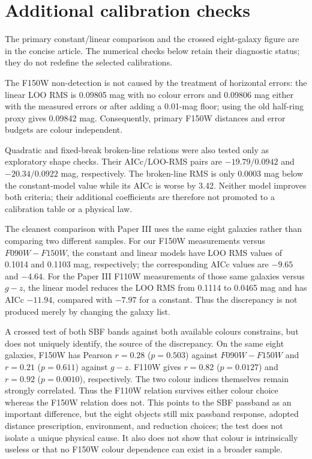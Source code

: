 \documentclass[nodoi,nocopyright]{pas}
\begin{document}
\section{Additional calibration checks}
\label{sec:notes-calibration}
The primary constant/linear comparison and the crossed eight-galaxy figure
are in the concise article. The numerical checks below retain their
diagnostic status; they do not redefine the selected calibrations.

The F150W non-detection is not caused by the treatment of horizontal errors: the linear LOO RMS is 0.09805
mag with no colour errors and 0.09806 mag either with the measured errors or
after adding a 0.01-mag floor; using the old half-ring proxy gives 0.09842
mag. Consequently, primary F150W distances and error budgets are colour independent.

Quadratic and fixed-break broken-line relations were also tested only as
exploratory shape checks. Their AICc/LOO-RMS pairs are $-19.79/0.0942$ and
$-20.34/0.0922$ mag, respectively. The broken-line RMS is only 0.0003 mag
below the constant-model value while its AICc is worse by 3.42. Neither model
improves both criteria; their additional coefficients are therefore not
promoted to a calibration table or a physical law.

The cleanest comparison with Paper III uses the same eight galaxies rather
than comparing two different samples. For our F150W measurements versus
$F090W-F150W$, the constant and linear models have LOO RMS values of 0.1014
and 0.1103 mag, respectively; the corresponding AICc values are $-9.65$ and
$-4.64$. For the Paper III F110W measurements of those same galaxies versus
$g-z$, the linear model reduces the LOO RMS from 0.1114 to 0.0465 mag and has
AICc $-11.94$, compared with $-7.97$ for a constant. Thus the discrepancy is
not produced merely by changing the galaxy list.

A crossed test of both SBF bands against both available colours constrains,
but does not uniquely identify, the source of the discrepancy. On the same
eight galaxies, F150W has Pearson
$r=0.28$ ($p=0.503$) against $F090W-F150W$ and $r=0.21$ ($p=0.611$)
against $g-z$. F110W gives $r=0.82$ ($p=0.0127$) and $r=0.92$
($p=0.0010$), respectively. The two colour indices themselves remain strongly
correlated. Thus the F110W relation survives either colour choice whereas the
F150W relation does not. This points to the SBF passband as an important
difference, but the eight objects still mix passband response, adopted
distance prescription, environment, and reduction choices; the test does not
isolate a unique physical cause. It also does not show that colour is
intrinsically useless or that no F150W colour dependence can exist in a broader
sample.
\end{document}
